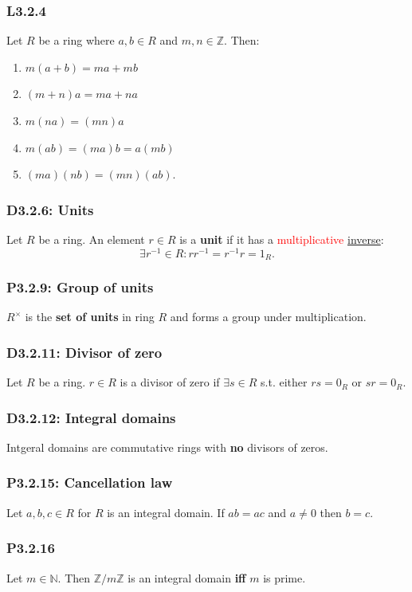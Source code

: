 \documentclass{article}
\begin{document}
\begin{multicols*}{3}
\subsubsection*{L3.2.4}
Let $R$ be a ring where $a,b\in R$ and
$m,n\in\mathbb{Z}$. Then:
\begin{enumerate}
    \item $m(a+b)=ma+mb$
    \item $(m+n)a=ma+na$
    \item $m(na)=(mn)a$
    \item $m(ab)=(ma)b=a(mb)$
    \item $(ma)(nb)=(mn)(ab).$
\end{enumerate}

\subsubsection*{D3.2.6: Units}
Let $R$ be a ring. An element $r\in R$
is a \textbf{unit} if it has a
\textcolor{red}{multiplicative} \underline{inverse}:
$$\exists r^{-1}\in R: rr^{-1}=r^{-1}r=1_R.$$

\subsubsection*{P3.2.9: Group of units}
$R^{\times}$ is the \textbf{set of units} in ring $R$
and forms a group under multiplication.

\subsubsection*{D3.2.11: Divisor of zero}
Let $R$ be a ring. $r\in R$ is a divisor of zero
if $\exists s\in R$ s.t. either $rs=0_R$ or $sr=0_R$.

\subsubsection*{D3.2.12: Integral domains}
Intgeral domains are commutative rings
with \textbf{no} divisors of zeros.

\subsubsection*{P3.2.15: Cancellation law}
Let $a,b,c\in R$ for $R$ is an integral domain.
If $ab=ac$ and $a\neq0$ then $b=c$.

\subsubsection*{P3.2.16}
Let $m\in\mathbb{N}$. Then $\mathbb{Z}/m\mathbb{Z}$ 
is an integral domain \textbf{if{}f} $m$ is prime.


\end{multicols*}
\end{document}
